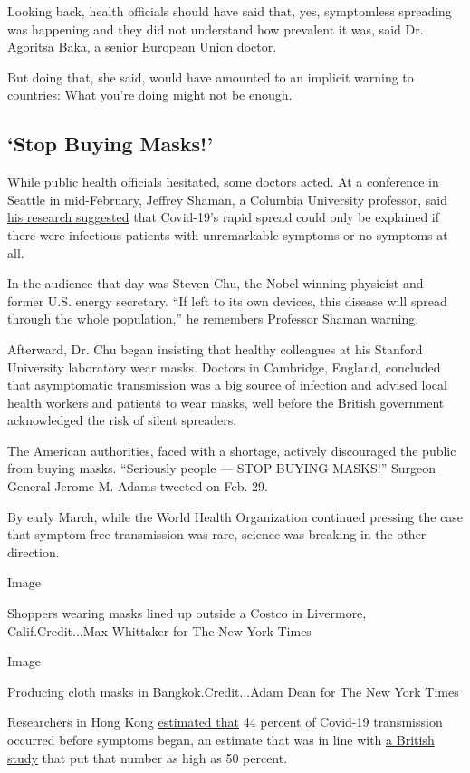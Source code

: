 Looking back, health officials should have said that, yes, symptomless
spreading was happening and they did not understand how prevalent it
was, said Dr. Agoritsa Baka, a senior European Union doctor.

But doing that, she said, would have amounted to an implicit warning to
countries: What you're doing might not be enough.

\hypertarget{stop-buying-masks}{%
\subsection{`Stop Buying Masks!'}\label{stop-buying-masks}}

While public health officials hesitated, some doctors acted. At a
conference in Seattle in mid-February, Jeffrey Shaman, a Columbia
University professor, said
\href{https://science.sciencemag.org/content/368/6490/489}{his research
suggested} that Covid-19's rapid spread could only be explained if there
were infectious patients with unremarkable symptoms or no symptoms at
all.

In the audience that day was Steven Chu, the Nobel-winning physicist and
former U.S. energy secretary. ``If left to its own devices, this disease
will spread through the whole population,'' he remembers Professor
Shaman warning.

Afterward, Dr. Chu began insisting that healthy colleagues at his
Stanford University laboratory wear masks. Doctors in Cambridge,
England, concluded that asymptomatic transmission was a big source of
infection and advised local health workers and patients to wear masks,
well before the British government acknowledged the risk of silent
spreaders.

The American authorities, faced with a shortage, actively discouraged
the public from buying masks. ``Seriously people --- STOP BUYING
MASKS!'' Surgeon General Jerome M. Adams tweeted on Feb. 29.

By early March, while the World Health Organization continued pressing
the case that symptom-free transmission was rare, science was breaking
in the other direction.

Image

Shoppers wearing masks lined up outside a Costco in Livermore,
Calif.Credit...Max Whittaker for The New York Times

Image

Producing cloth masks in Bangkok.Credit...Adam Dean for The New York
Times

Researchers in Hong Kong
\href{https://www.nature.com/articles/s41591-020-0869-5.pdf}{estimated
that} 44 percent of Covid-19 transmission occurred before symptoms
began, an estimate that was in line with
\href{https://science.sciencemag.org/content/368/6491/eabb6936}{a
British study} that put that number as high as 50 percent.

